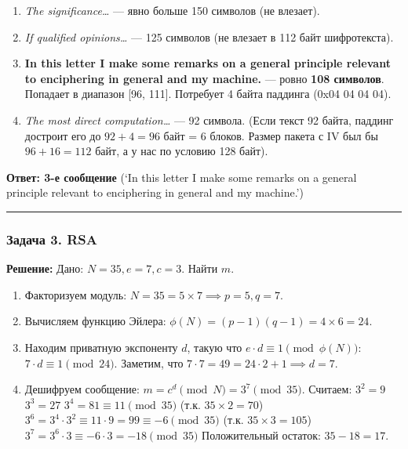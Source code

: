 \begin{enumerate}
\def\labelenumi{\arabic{enumi}.}
\tightlist
\item
  \emph{The significance\ldots{}} --- явно больше 150 символов (не влезает).
\item
  \emph{If qualified opinions\ldots{}} --- 125 символов (не влезает в 112 байт шифротекста).
\item
  \textbf{In this letter I make some remarks on a general principle relevant to enciphering in general and my machine.} --- ровно \textbf{108 символов}. Попадает в диапазон {[}96, 111{]}. Потребует 4 байта паддинга (0x04 04 04 04).
\item
  \emph{The most direct computation\ldots{}} --- 92 символа. (Если текст 92 байта, паддинг достроит его до \(92+4 = 96\) байт = 6 блоков. Размер пакета с IV был бы \(96+16 = 112\) байт, а у нас по условию 128 байт).
\end{enumerate}

\textbf{Ответ: 3-е сообщение} (`In this letter I make some remarks on a general principle relevant to enciphering in general and my machine.')

\begin{center}\rule{0.5\linewidth}{0.5pt}\end{center}

\subsubsection{Задача 3. RSA}\label{ux437ux430ux434ux430ux447ux430-3.-rsa}

\textbf{Решение:} Дано: \(N=35, e=7, c=3\). Найти \(m\).

\begin{enumerate}
\def\labelenumi{\arabic{enumi}.}
\tightlist
\item
  Факторизуем модуль: \(N = 35 = 5 \times 7 \implies p=5, q=7\).
\item
  Вычисляем функцию Эйлера: \(\phi(N) = (p-1)(q-1) = 4 \times 6 = 24\).
\item
  Находим приватную экспоненту \(d\), такую что \(e \cdot d \equiv 1 \pmod{\phi(N)}\): \(7 \cdot d \equiv 1 \pmod{24}\). Заметим, что \(7 \cdot 7 = 49 = 24 \cdot 2 + 1 \implies d = 7\).
\item
  Дешифруем сообщение: \(m = c^d \pmod N = 3^7 \pmod{35}\). Считаем: \(3^2 = 9\) \(3^3 = 27\) \(3^4 = 81 \equiv 11 \pmod{35}\) (т.к. \(35 \times 2 = 70\)) \(3^6 = 3^4 \cdot 3^2 \equiv 11 \cdot 9 = 99 \equiv -6 \pmod{35}\) (т.к. \(35 \times 3 = 105\)) \(3^7 = 3^6 \cdot 3 \equiv -6 \cdot 3 = -18 \pmod{35}\) Положительный остаток: \(35 - 18 = 17\).
\end{enumerate}


